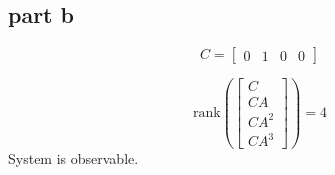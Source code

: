 \subsection{part b}\label{sec:Q6b}

$$
C = \begin{bmatrix}
    0 & 1 & 0 & 0
\end{bmatrix}
$$

$$
\text{rank}\left(\begin{bmatrix}
    C \\
    CA \\
    CA^2 \\
    CA^3
\end{bmatrix}\right) = 4
$$
System is observable.